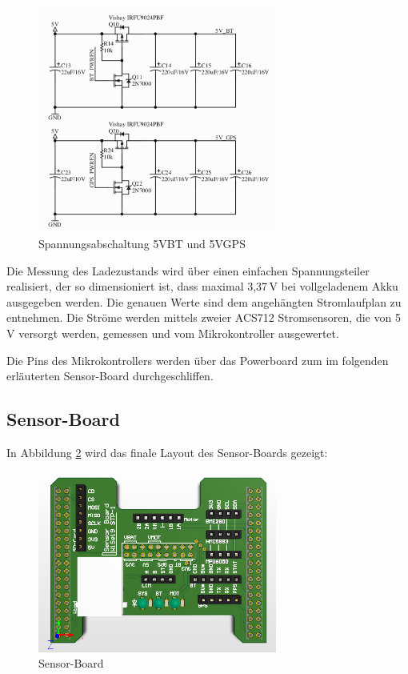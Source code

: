 \begin{figure}[H]
  \centering
  \includegraphics[width=0.7\textwidth]{./img/spannungsabschaltung.png}
  \caption{Spannungsabschaltung 5VBT und 5VGPS}\label{fig.spannungsabschaltung}
\end{figure}

Die Messung des Ladezustands wird über einen einfachen Spannungsteiler realisiert, der so dimensioniert ist, dass maximal 3,37\,V bei vollgeladenem Akku ausgegeben werden. Die genauen Werte sind dem angehängten Stromlaufplan zu entnehmen. Die Ströme werden mittels zweier ACS712 Stromsensoren, die von 5\,V versorgt werden, gemessen und vom Mikrokontroller ausgewertet.

Die Pins des Mikrokontrollers werden über das Powerboard zum im folgenden erläuterten Sensor-Board durchgeschliffen.

\subsection{Sensor-Board}
In Abbildung \ref{fig.sensorboard} wird das finale Layout des Sensor-Boards gezeigt:

\begin{figure}[H]
  \centering
  \includegraphics[width=0.7\textwidth]{./img/PCB_Sensors_3D_top.png}
  \caption{Sensor-Board}\label{fig.sensorboard}
\end{figure}

